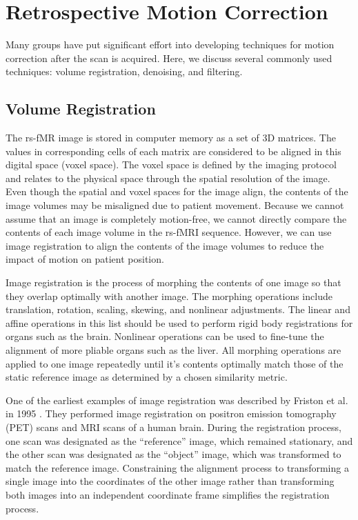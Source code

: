 \section{Retrospective Motion Correction}

Many groups have put significant effort into developing techniques for motion correction after the scan is acquired. Here, we discuss several commonly used techniques: volume registration, denoising, and filtering. %

\subsection{Volume Registration}

The rs-fMR image is stored in computer memory as a set of 3D matrices. The values in corresponding cells of each matrix are considered to be aligned in this digital space (voxel space). The voxel space is defined by the imaging protocol and relates to the physical space through the spatial resolution of the image. Even though the spatial and voxel spaces for the image align, the contents of the image volumes may be misaligned due to patient movement. Because we cannot assume that an image is completely motion-free, we cannot directly compare the contents of each image volume in the rs-fMRI sequence. However, we can use image registration to align the contents of the image volumes to reduce the impact of motion on patient position.

Image registration is the process of morphing the contents of one image so that they overlap optimally with another image. The morphing operations include translation, rotation, scaling, skewing, and nonlinear adjustments. The linear and affine operations in this list should be used to perform rigid body registrations for organs such as the brain. Nonlinear operations can be used to fine-tune the alignment of more pliable organs such as the liver. All morphing operations are applied to one image repeatedly until it's contents optimally match those of the static reference image as determined by a chosen similarity metric. 

One of the earliest examples of image registration was described by Friston et al. in 1995 \cite{Friston1995}. They performed image registration on positron emission tomography (PET) scans and MRI scans of a human brain. During the registration process, one scan was designated as the ``reference'' image, which remained stationary, and the other scan was designated as the ``object'' image, which was transformed to match the reference image. Constraining the alignment process to transforming a single image into the coordinates of the other image rather than transforming both images into an independent coordinate frame simplifies the registration process.

